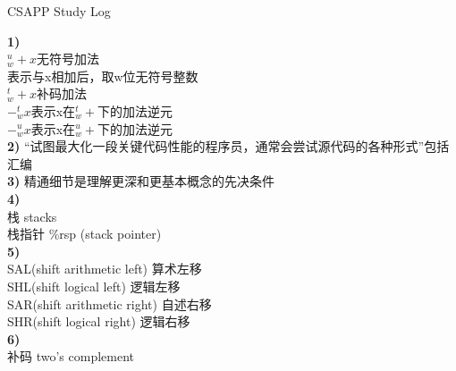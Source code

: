 \documentclass{article}
\begin{document}
\begin{CJK}{UTF8}{gkai}
\end{CJK}
\begin{CJK}{UTF8}{gbsn}
\end{CJK}
\begin{CJK}{UTF8}{uyhei}
\fontsize{40pt}{40pt}\selectfont
\centerline{CSAPP Study Log}		
\fontsize{18pt}{18pt}\selectfont
\noindent\textbf{1)}			\\
$_w^u+x$无符号加法			\\[0.5ex]
表示与x相加后，取w位无符号整数		\\[0.5ex]
$_w^t+x$补码加法			\\[0.5ex]
$-_w^tx$表示x在$^t_w+$下的加法逆元	\\[0.5ex]
$-_w^ux$表示x在$_w^u+$下的加法逆元	\\[1ex]
\textbf{2)}
``试图最大化一段关键代码性能的程序员，通常会尝试源代码的各种形式''包括汇编	\\[1ex]
\textbf{3)}
精通细节是理解更深和更基本概念的先决条件	\\[1ex]
\textbf{4)}	\\
栈	stacks	\\[1ex]
栈指针	\%rsp	(stack pointer)	\\[1ex]
\textbf{5)}	\\
SAL(shift arithmetic left)	算术左移	\\
SHL(shift logical left)		逻辑左移	\\
SAR(shift arithmetic right)	自述右移	\\
SHR(shift logical right)	逻辑右移	\\[1ex]
\textbf{6)}	\\
补码	two's complement





\end{CJK}
\end{document}
